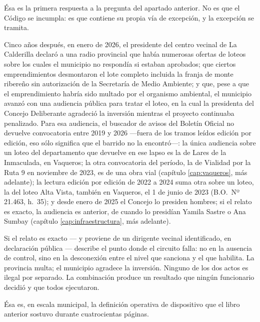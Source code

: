 Ésa es la primera respuesta a la pregunta del apartado anterior. No es que el Código se incumpla: es que contiene su propia vía de excepción, y la excepción se tramita.

Cinco años después, en enero de 2026, el presidente del centro vecinal de La Calderilla declaró a una radio provincial que había numerosas ofertas de loteos sobre los cuales el municipio no respondía si estaban aprobados; que ciertos emprendimientos desmontaron el lote completo incluida la franja de monte ribereño sin autorización de la Secretaría de Medio Ambiente; y que, pese a que el emprendimiento habría sido multado por el organismo ambiental, el municipio avanzó con una audiencia pública para tratar el loteo, en la cual la presidenta del Concejo Deliberante agradeció la inversión mientras el proyecto continuaba penalizado. Para esa audiencia, el buscador de avisos del Boletín Oficial no devuelve convocatoria entre 2019 y 2026 ---fuera de los tramos leídos edición por edición, eso sólo significa que el barrido no la encontró---: la única audiencia sobre un loteo del departamento que devuelve en ese lapso es la de Lares de la Inmaculada, en Vaqueros; la otra convocatoria del período, la de Vialidad por la Ruta 9 en noviembre de 2023, es de una obra vial (capítulo \ref{cap:vaqueros}, más adelante); la lectura edición por edición de 2022 a 2024 suma otra sobre un loteo, la del loteo Alta Vista, también en Vaqueros, el 1 de junio de 2023 (B.O.\ Nº 21.463, h.\ 35); y desde enero de 2025 el Concejo lo presiden hombres; si el relato es exacto, la audiencia es anterior, de cuando lo presidían Yamila Sastre o Ana Sumbay (capítulo \ref{cap:infraestructura}, más adelante).

Si el relato es exacto --- y proviene de un dirigente vecinal identificado, en declaración pública --- describe el punto donde el circuito falla: no en la ausencia de control, sino en la desconexión entre el nivel que sanciona y el que habilita. La provincia multa; el municipio agradece la inversión. Ninguno de los dos actos es ilegal por separado. La combinación produce un resultado que ningún funcionario decidió y que todos ejecutaron.

Ésa es, en escala municipal, la definición operativa de dispositivo que el libro anterior sostuvo durante cuatrocientas páginas.

